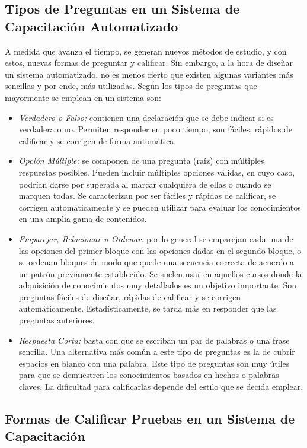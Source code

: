 \subsection{Tipos de Preguntas en un Sistema de Capacitación Automatizado}
A medida que avanza el tiempo, se generan nuevos métodos de estudio, y con estos, nuevas formas de preguntar y calificar. Sin embargo, a la hora de diseñar un sistema automatizado, no es menos cierto que existen algunas variantes más sencillas y por ende, más utilizadas. Según \cite{referencia12} los tipos de preguntas que mayormente se emplean en un sistema son:
\begin{itemize}
\item \textsl{Verdadero o Falso:} contienen una declaración que se debe indicar si es verdadera o no. Permiten responder en poco tiempo, son fáciles, rápidos de calificar y se corrigen de forma automática.
\item \textsl{Opción Múltiple:} se componen de una pregunta (raíz) con
múltiples respuestas posibles. Pueden incluir múltiples opciones válidas, en cuyo caso, podrían darse por superada al marcar cualquiera de ellas o cuando se marquen todas. Se caracterizan por ser fáciles y rápidas de calificar, se
corrigen automáticamente y se pueden utilizar para evaluar los conocimientos en una amplia gama de contenidos.
\item \textsl{Emparejar, Relacionar u Ordenar:} por lo general se emparejan cada una de las opciones del primer bloque con las opciones dadas en el segundo bloque, o se ordenan bloques de modo que quede una secuencia correcta de acuerdo a un patrón previamente establecido. Se suelen usar en aquellos cursos donde la adquisición de conocimientos muy detallados es un objetivo importante. Son preguntas fáciles de diseñar, rápidas de calificar y se corrigen
automáticamente. Estadísticamente, se tarda más en responder que las preguntas anteriores.
\item \textsl{Respuesta Corta:} basta con que se escriban un par de palabras o una frase sencilla. Una alternativa más común a este tipo de preguntas es la de cubrir espacios en blanco con una palabra. Este tipo de preguntas son muy útiles para que se demuestren los conocimientos basados en hechos o palabras claves. La dificultad para calificarlas depende del estilo que se decida emplear.
\end{itemize}

\subsection{Formas de Calificar Pruebas en un Sistema de Capacitación}
